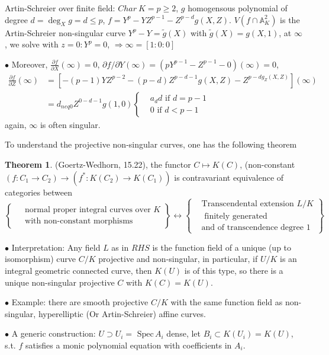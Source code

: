 \documentclass[11pt]{article}
\theoremstyle{definition}
\newtheorem{thm}{Theorem}[section]
\newcommand{\spec}{\text{ Spec}\,}
\newcommand{\affn}{\mathbb A}
\newcommand{\pd}{\partial}
\newcommand{\Lrta}{\Longrightarrow}
\newcommand{\lrta}{\longrightarrow}
\newcommand{\llrta}{\longleftrightarrow}
\begin{document}
Artin-Schreier over finite field: $Char\  K=p\geq 2$, $g$ homogensous polynomial of degree $d=\deg_X g=d\leq p$, $f=Y^p-YZ^{p-1}-Z^{p-d}g(X,Z)$.
$V(f\cap \affn^2_K)$ is the Artin-Schreier non-singular curve $Y^p-Y=\tilde{g}(X)$ with $\tilde{g}(X)=g(X,1)$, at $\infty$, we solve with $z=0:Y^p=0$, $\Lrta \infty=[1:0:0]$

$\bullet$ Moreover, $\frac{\pd f}{\pd X}(\infty)=0$, $\pd f/\pd Y(\infty)=(pY^{p-1}-Z^{p-1}-0)(\infty)=0$, 
$$
\begin{aligned}
\frac{\pd f}{\pd Z}(\infty)
&=[-(p-1)YZ^{p-2}-(p-d)Z^{p-d-1}g(X,Z)-Z^{p-dg_Z(X,Z)}](\infty)\\
&= d_{neq 0} Z^{0-d-1} g(1,0)\left\{\begin{aligned}
&a_d d \text{ if } d=p-1\\
&0\text{ if } d< p-1
\end{aligned}\right.
\end{aligned}
$$
again, $\infty$ is often singular.

To understand the projective non-singular curves, one has the following theorem
\begin{thm}\label{chap7thm:equivalence_0f_categories_normal_proper_integral_curves_over_K}
(Goertz-Wedhorn, 15.22), the functor
$C\mapsto K(C)$, (non-constant $(f:C_1\lrta C_2)\lrta (f^*:K(C_2)\lrta K(C_1))$ is contravariant equivalence of categories between
$$
\left\{\begin{aligned}
&\text{ normal proper integral curves over $K$}\\
&\text{ with non-constant morphisms}
\end{aligned}\right\}
\llrta 
\left\{\begin{aligned}
&\text{Transcendental extension $L/K$}\\
&\text{ finitely generated}\\ 
&\text{and of transcendence degree $1$}
\end{aligned}\right\}
$$
\end{thm}
$\bullet$ Interpretation: Any field $L$ as in $RHS$ is the function field of a unique (up  to isomorphism) curve $C/K$ projective and non-singular, in particular, if $U/K$ is an integral geometric connected curve, then $K(U)$ is of this type, so there is a unique non-singular projective $C$ with $K(C)=K(U)$.

$\bullet$ Example: there are smooth projective $C/K$ with the same function field as non-singular, hyperelliptic (Or Artin-Schreier) affine curves.

$\bullet$ A generic construction:
$U\supset U_i =\spec A_i$ dense, let $B_i\subset K(U_i)=K(U)$, s.t. $f$ satisfies a monic polynomial equation with coefficients in $A_i$.
\end{document}
